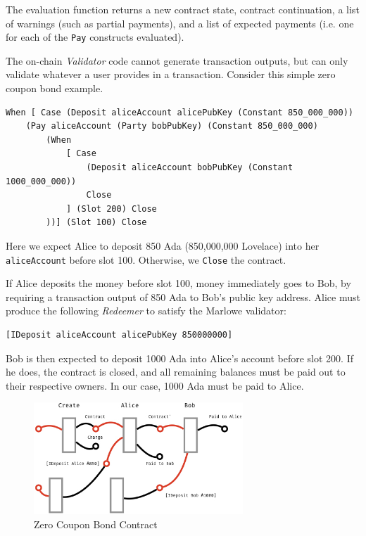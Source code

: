 \documentclass[runningheads]{llncs}
\begin{document}
The evaluation function returns a new contract state, contract continuation, a list of warnings (such as partial payments),
and a list of expected payments (i.e. one for each of the \texttt{Pay} constructs evaluated).

The on-chain \emph{Validator} code cannot generate transaction outputs,
but can only validate whatever a user provides in a transaction.
Consider this simple zero coupon bond example.

\begin{verbatim}
When [ Case (Deposit aliceAccount alicePubKey (Constant 850_000_000))
    (Pay aliceAccount (Party bobPubKey) (Constant 850_000_000)
        (When
            [ Case
                (Deposit aliceAccount bobPubKey (Constant 1000_000_000))
                Close
            ] (Slot 200) Close
        ))] (Slot 100) Close
\end{verbatim}

\noindent
Here we expect Alice to deposit 850 Ada (850,000,000 Lovelace) into her \texttt{aliceAccount} before slot 100.
Otherwise, we \texttt{Close} the contract.

If Alice deposits the money before slot 100, money immediately goes to Bob,
by requiring a transaction output of 850 Ada to Bob's public key address.
Alice must produce the following \emph{Redeemer} to satisfy the Marlowe validator:

\begin{verbatim}
[IDeposit aliceAccount alicePubKey 850000000]
\end{verbatim}

\noindent
Bob is then expected to deposit 1000 Ada into Alice's account before slot 200.
If he does, the contract is closed, and all remaining balances must be paid out
to their respective owners. In our case, 1000 Ada must be paid to Alice.

\begin{figure}[!h]
    \centering
    \includegraphics[width=0.7\textwidth]{figures/Marlowe3-Figures-004.jpeg}
    \caption{Zero Coupon Bond Contract}
    \label{fig:zero-coupon-bond}
\end{figure}
\end{document}
